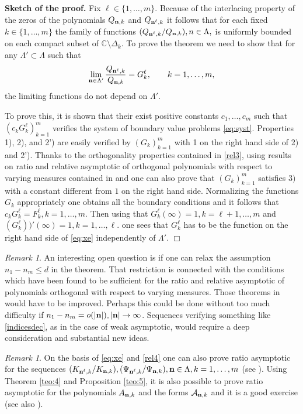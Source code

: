 \documentclass{amsart}
\theoremstyle{definition}
\theoremstyle{remark}
\newtheorem{rem}[teo]{\sc Remark}
\begin{document}
{\bf Sketch of the proof.} Fix $\ell \in \{1,\ldots,m\}$. Because of the interlacing property of the zeros of the polynomials $Q_{{\bf n},k}$  and $Q_{{\bf n}^\ell,k}$ it follows that for each fixed $k \in \{1,\ldots,m\}$ the family of functions $(Q_{{\bf n}^\ell,k}/Q_{{\bf n},k}), n \in \Lambda,$ is uniformly bounded on each compact subset of $\mathbb{C} \setminus \Delta_k$. To prove the theorem we need to show that for any $\Lambda' \subset \Lambda$ such that
\[ \lim_{{\bf n} \in \Lambda'} \frac{Q_{{\bf n}^\ell,k}}{Q_{{\bf n},k}} = G_k^\ell, \qquad k=1,\ldots,m,
\]
the limiting functions do not depend on $\Lambda'$.

To prove this, it is shown that their exist positive constants $c_1,\ldots,c_m$ such that $(c_k G_k^\ell)_{k=1}^m$ verifies the system of boundary value problems \eqref{eq:syst}. Properties 1), 2), and 2') are easily verified by $(G_k)_{k=1}^m$ with 1 on the right hand side of 2) and 2'). Thanks to the orthogonality properties contained in \eqref{rel3}, using results on  ratio and relative asymptotic of orthogonal polynomials with respect to varying measures contained in \cite[Theorem 6]{kn:B-G} and  \cite[Theorem 3.2]{kn:B-G2} one can also prove that $(G_k)_{k=1}^m$ satisfies $3)$ with a constant different from $1$ on the right hand side.  Normalizing the functions $G_k$ appropriately one obtains all the boundary conditions and it follows that $c_kG_k^\ell = F_k^\ell, k=1,\ldots,m$. Then using that $G_k^\ell (\infty) = 1, k=\ell +1,\ldots,m$ and $(G_k^\ell))'(\infty) = 1, k=1,\ldots,\ell$. one sees that $G_k^\ell$ has to be the function on the right hand side of \eqref{eq:xe} independently of $\Lambda'$. \hfill $\Box$

\begin{rem} An interesting open question is if one can relax the assumption $n_1 - n_m \leq d$ in the theorem. That restriction is connected with the conditions which have been found to be sufficient for the ratio and relative asymptotic of polynomials orthogonal with respect to varying measures. Those theorems in \cite{kn:B-G,kn:B-G2} would have to be improved.   Perhaps this could be done without too much difficulty if $n_1- n_m = o(|{\bf n}|), |{\bf n}| \to \infty$. Sequences verifying something like \eqref{indicesdec}, as in the case of weak asymptotic, would require a deep consideration and substantial new ideas.
\end{rem}

\begin{rem}
On the basis  of \eqref{eq:xe} and \eqref{rel4} one can also prove ratio asymptotic for the sequences $(K_{{\bf n}^\ell,k}/K_{{\bf n},k}),(\Psi_{{\bf n}^\ell,k}/\Psi_{{\bf n},k}), {\bf n} \in \Lambda, k=1,\ldots,m$ (see \cite{AptLopRoc, LL}). Using Theorem \ref{teo:4} and Proposition \ref{teo:5}, it is also possible to prove ratio asymptotic for the polynomials $A_{{\bf n},k}$ and the forms $\mathcal{A}_{{\bf n},k}$ and it is a good exercise (see also \cite{FLLS}).
\end{rem}
\end{document}
